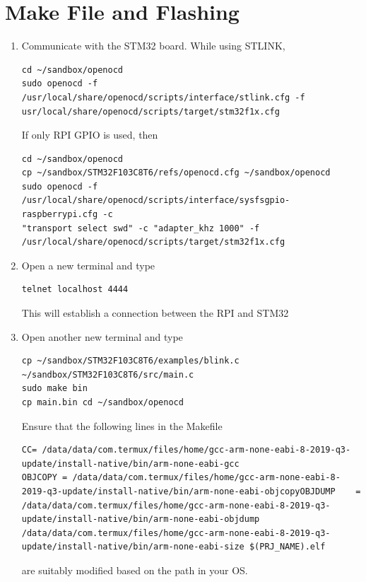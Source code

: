 \documentclass[journal,12pt,twocolumn]{IEEEtran}
\begin{document}
\section{Make File and Flashing}
\begin{enumerate}[1.]
\item Communicate with the STM32 board.  While using STLINK,
\begin{lstlisting}
cd ~/sandbox/openocd
sudo openocd -f /usr/local/share/openocd/scripts/interface/stlink.cfg -f usr/local/share/openocd/scripts/target/stm32f1x.cfg
\end{lstlisting}
If only RPI GPIO is used, then
\begin{lstlisting}
cd ~/sandbox/openocd
cp ~/sandbox/STM32F103C8T6/refs/openocd.cfg ~/sandbox/openocd
sudo openocd -f /usr/local/share/openocd/scripts/interface/sysfsgpio-raspberrypi.cfg -c 
"transport select swd" -c "adapter_khz 1000" -f /usr/local/share/openocd/scripts/target/stm32f1x.cfg
\end{lstlisting}
\item Open a new terminal and type
\begin{lstlisting}
telnet localhost 4444
\end{lstlisting}
This will establish a connection between the RPI and STM32
\item Open another new terminal and type
\begin{lstlisting}
cp ~/sandbox/STM32F103C8T6/examples/blink.c ~/sandbox/STM32F103C8T6/src/main.c
sudo make bin
cp main.bin cd ~/sandbox/openocd
\end{lstlisting}
Ensure that the following lines in the Makefile 
\begin{lstlisting}
CC= /data/data/com.termux/files/home/gcc-arm-none-eabi-8-2019-q3-update/install-native/bin/arm-none-eabi-gcc
OBJCOPY	= /data/data/com.termux/files/home/gcc-arm-none-eabi-8-2019-q3-update/install-native/bin/arm-none-eabi-objcopyOBJDUMP    = /data/data/com.termux/files/home/gcc-arm-none-eabi-8-2019-q3-update/install-native/bin/arm-none-eabi-objdump
/data/data/com.termux/files/home/gcc-arm-none-eabi-8-2019-q3-update/install-native/bin/arm-none-eabi-size $(PRJ_NAME).elf
\end{lstlisting}
%
are suitably modified based on the path in your OS.


\end{enumerate}
\end{document}
